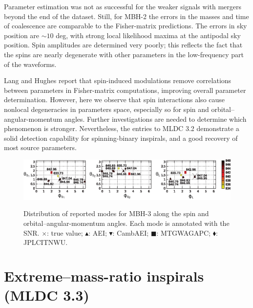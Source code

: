 \documentclass{iopart}
\begin{document}
Parameter estimation was not as successful for the weaker signals with mergers beyond the end of the dataset. Still, for MBH-2 the errors in the masses and time of coalescence are comparable to the Fisher-matrix predictions. The errors in sky position are $\sim 10$ deg, with strong local likelihood maxima at the antipodal sky position. Spin amplitudes are determined very poorly; this reflects the fact that the spins are nearly degenerate with other parameters in the low-frequency part of the waveforms.

Lang and Hughes \cite{SpinBBHLangHughes} report that spin-induced modulations remove correlations between parameters in Fisher-matrix computations, improving overall parameter determination. However, here we observe that spin interactions also cause nonlocal degeneracies in parameters space, especially so for spin and orbital--angular-momentum angles. Further investigations are needed to determine which phenomenon is stronger. Nevertheless, the entries to MLDC 3.2 demonstrate a solid detection capability for spinning-binary inspirals, and a good recovery of most source parameters.
%
\begin{figure}
\includegraphics[width=\textwidth]{spin_directions.eps} \\[-18pt]
\caption{Distribution of reported modes for MBH-3 along the spin and orbital--angular-momentum angles. Each mode is annotated with the SNR.
$\times$: true value; $\blacktriangle$: AEI; $\blacktriangledown$: CambAEI; $\blacksquare$: MTGWAGAPC; $\blacklozenge$: JPLCITNWU.\label{fig:SMBH_spinLdeg}} \vspace{-12pt}
\end{figure}

\section{Extreme--mass-ratio inspirals (MLDC 3.3)}
\end{document}
